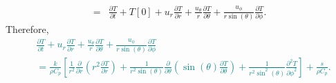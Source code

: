 \documentclass[12pt]{article}
\begin{document}
\begin{ex}
\begin{solution}
\begin{align*}
    =&\frac{\partial T}{\partial t}+T\left[0\right]+u_r\frac{\partial T}{\partial r}+\frac{u_{\theta}}{r}\frac{\partial T}{\partial\theta}+\frac{u_{\phi}}{r\sin(\theta)}\frac{\partial T}{\partial\phi}.
  \end{align*}
  Therefore,\textcolor{teal}{
  \begin{align*}
    &\frac{\partial T}{\partial t}+u_r\frac{\partial T}{\partial r}+\frac{u_{\theta}}{r}\frac{\partial T}{\partial\theta}+\frac{u_{\phi}}{r\sin(\theta)}\frac{\partial T}{\partial\phi}\\
    &=\frac{k}{\rho C_p}\left[\frac{1}{r^2}\frac{\partial}{\partial r}\left(r^2\frac{\partial T}{\partial r}\right)+\frac{1}{r^2\sin(\theta)}\frac{\partial}{\partial\theta}\left(\sin(\theta)\frac{\partial T}{\partial \theta}\right)+\frac{1}{r^2\sin^2(\theta)}\frac{\partial^2 T}{{\partial \phi}^2}\right]+\frac{s}{\rho C_p}.
  \end{align*}}
  
\end{solution}

\end{ex}
\end{document}
